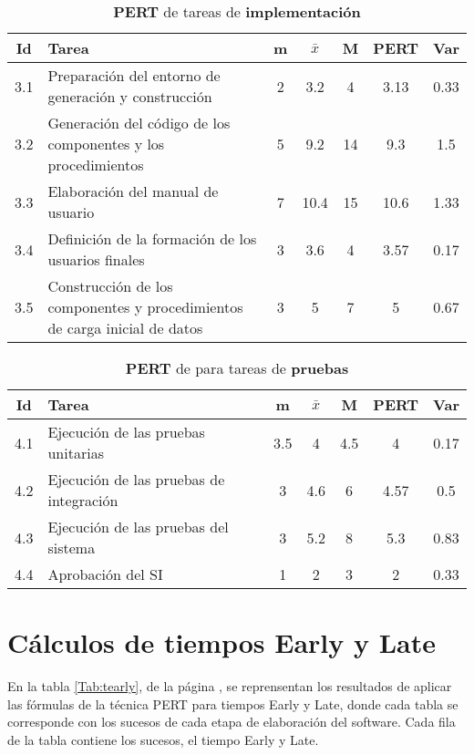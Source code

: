 \documentclass[11pt,a4paper,spanish,twoside]{report}
\begin{document}
\begin{table}[!h]
\centering
  \begin{tabular}{|c||p{5.3cm}||c|c|c||c|c|}
    \hline
    \textbf{Id} & \textbf{Tarea} & \textbf{m} & 
    \textbf{$\bar{x}$} &\textbf{M} & \textbf{PERT} & \textbf{Var}\\
    \hline \hline
    3.1 & Preparación del entorno de generación y construcción & 2 & 3.2  & 4
    & 3.13 & 0.33\\
    \hline
    3.2 & Generación del código de los componentes y los procedimientos & 5 &
    9.2 & 14 & 9.3 & 1.5\\
    \hline
    3.3 & Elaboración del manual de usuario & 7 & 10.4 & 15 & 10.6 & 1.33\\
    \hline
    3.4 & Definición de la formación de los usuarios finales & 3 & 3.6 & 4
    &3.57 & 0.17\\
    \hline
    3.5 & Construcción de los componentes y procedimientos de carga inicial
    de datos & 3 & 5 & 7 & 5 & 0.67\\
    \hline
  \end{tabular}
  \caption{\textbf{PERT} de tareas de \textbf{implementación}}
  \label{Tab:PERTimp}
\end{table}

\begin{table}[!h]
\centering
  \begin{tabular}{|c||p{5.3cm}||c|c|c||c|c|}
    \hline
    \textbf{Id} & \textbf{Tarea} & \textbf{m} & 
    \textbf{$\bar{x}$} &\textbf{M} & \textbf{PERT} & \textbf{Var}\\
    \hline \hline
    4.1 & Ejecución de las pruebas unitarias & 3.5 & 4 & 4.5 & 4 & 0.17\\
    \hline
    4.2 & Ejecución de las pruebas de integración & 3 & 4.6 & 6 & 4.57 & 0.5\\
    \hline
    4.3 & Ejecución de las pruebas del sistema & 3 & 5.2 & 8 & 5.3 & 0.83\\
    \hline
    4.4 & Aprobación del SI & 1 & 2 & 3 & 2 & 0.33\\
    \hline
  \end{tabular}
  \caption{\textbf{PERT} de para tareas de \textbf{pruebas}}
  \label{Tab:PERTpru}
\end{table}

\section{Cálculos de tiempos Early y Late}
En la tabla \ref{Tab:tearly}, de la página \pageref{Tab:tearly}, se
reprensentan los resultados de aplicar las
fórmulas de la técnica PERT para tiempos Early y Late, donde cada tabla se
corresponde con los sucesos de cada etapa de elaboración del software. Cada
fila de la tabla contiene los sucesos, el tiempo Early y Late.
\end{document}
